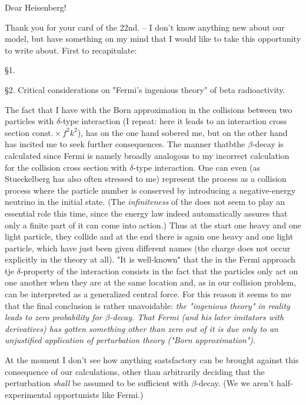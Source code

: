 \date{November 24, 1936}

Dear Heisenberg!

Thank you for your card of the 22nd. -- I don't know anything new about our model, but have something on my mind that I would like to take this opportunity to write about. First to recapitulate:

§1. 

§2. Critical considerations on "Fermi's ingenious theory" of beta radioactivity.

The fact that I have  with the Born approximation in the collisions between two particles with $\delta$-type interaction (I repeat: here it leads to an interaction cross section $\text{const.} \times f^2 k^2$), has on the one hand sobered me, but on the other hand has incited me to seek further consequences. The manner thatbthe $\beta$-decay is calculated since Fermi is namely broadly analogous to my incorrect calculation for the collision cross section with $\delta$-type interaction. One can even (as Stueckelberg has also often stressed to me) represent the process as a collision process where the particle number is conserved by introducing a negative-energy neutrino in the initial state. (The \textit{infiniteness} of the  does not seem to play an essential role this time, since the energy law indeed automatically assures that only a finite part of it can come into action.) Thus at the start  one heavy and one light particle, they collide and at the end there is again one heavy and one light particle, which have just been given different names (the charge does not occur explicitly in the theory at all). "It is well-known" that the in the Fermi approach tje $\delta$-property of the interaction consists in the fact that the particles only act on one another when they are at the same location and, as in our collision problem, can be interpreted as a generalized central force. For this reason it seems to me that the final conclusion is rather unavoidable: \textit{the "ingenious theory" in reality leads to zero probability for $\beta$-decay. That Fermi (and his later imitators with derivatives) has gotten something other than zero out of it is due only to an unjustified application of perturbation theory ("Born approximation")}.

At the moment I don't see how anything sastsfactory can be brought against this consequence of our calculations, other than arbitrarily deciding that the perturbation \textit{shall} be assumed to be sufficient with $\beta$-decay. (We we aren't half-experimental opportunists like Fermi.)

